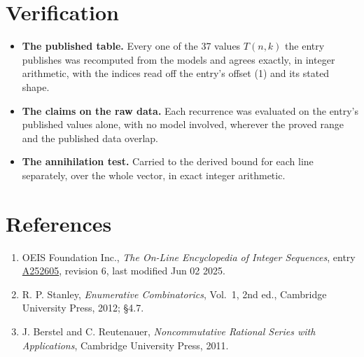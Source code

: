 \documentclass[11pt]{article}
\theoremstyle{definition}
\begin{document}
\section{Verification}

\begin{itemize}

\item {\bfseries The published table.} Every one of the 37 values $T(n,k)$ the entry publishes was recomputed from the models and agrees exactly, in integer arithmetic, with the indices read off the entry's offset (1) and its stated shape.

\item {\bfseries The claims on the raw data.} Each recurrence was evaluated on the entry's published values alone, with no model involved, wherever the proved range and the published data overlap.

\item {\bfseries The annihilation test.} Carried to the derived bound for each line separately, over the whole vector, in exact integer arithmetic.

\end{itemize}

\section{References}

\begin{enumerate}

\item OEIS Foundation Inc., \emph{The On-Line Encyclopedia of Integer Sequences}, entry \href{https://oeis.org/A252605}{A252605}, revision 6, last modified Jun 02 2025.

\item R. P. Stanley, \emph{Enumerative Combinatorics}, Vol.~1, 2nd ed., Cambridge University Press, 2012; \S4.7.

\item J. Berstel and C. Reutenauer, \emph{Noncommutative Rational Series with Applications}, Cambridge University Press, 2011.

\end{enumerate}
\end{document}

